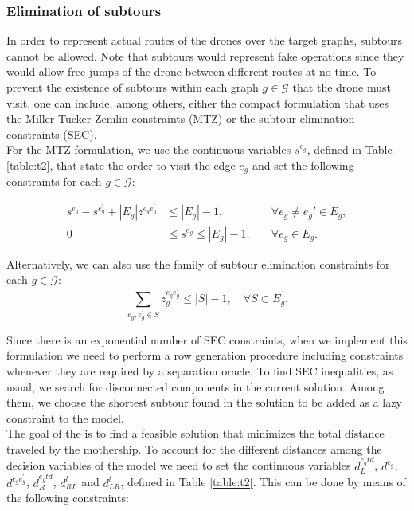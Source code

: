 \subsubsection*{Elimination of subtours}
\noindent
In order to represent actual routes of the drones over the target graphs, subtours cannot be allowed. Note that subtours would represent fake operations since they would allow free jumps of the drone between different routes at no time. To prevent the existence of subtours within each graph $g\in \mathcal G$ that the drone must visit, one can include, among others, either the compact formulation that uses the Miller-Tucker-Zemlin constraints (MTZ) or the subtour elimination  constraints (SEC).\\
\noindent
For the MTZ formulation, we use the continuous variables $s^{e_g}$, defined in Table \ref{table:t2}, that state the order to visit the edge $e_g$ and set the following constraints for each $g\in\mathcal G$:

\begin{align}
    s^{e_g} - s^{e^\prime_g} + |E_g|z^{e_ge^\prime_g} & \leq |E_g| - 1  , &\quad\forall e_g \neq e_g'\in E_g, \tag{MTZ$_1$} \label{MTZ1}\\
    0 & \leq s^{e_g} \leq |E_g| - 1, &\quad\forall e_g\in E_g.\tag{MTZ$_2$}\label{MTZ2}
\end{align}

\noindent
Alternatively, we can also use the family of subtour elimination constraints for each $g\in\mathcal G$:
\begin{equation}\tag{SEC}\label{SEC}
    \sum_{e_g, e^\prime_g \in S} z_g^{e_ge^\prime_g} \leq |S| - 1, \quad \forall S\subset E_g.
\end{equation}

\noindent
Since there is an exponential number of SEC constraints, when we implement this formulation we need to perform a row generation procedure including constraints whenever they are required by a separation oracle. To find SEC inequalities, as usual, we search for disconnected components in the current solution. Among them, we choose the shortest subtour found in the solution to be added as a lazy constraint to the model.\\

\noindent
 The goal of the \AMD\xspace is to find a feasible solution that minimizes the total distance traveled by the mothership. To account for the different distances among the decision variables of the model we need to set the continuous variables $d_L^{e_gtd}$, $d^{e_g}$, $d^{e_ge^\prime_g}$, $d_R^{e_gtd}$, $d_{RL}^t$ and $d_{LR}^t$, defined in Table \ref{table:t2}. This can be done by means of the following constraints:
 
